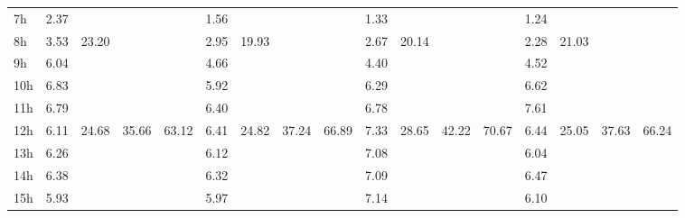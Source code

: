 \begin{center}
\begin{tabular}{l || c | c | c | c | c | c | c | c | c | c | c | c | c | c | c | c |}
7h & \multirow{1}{*}{ 2.37 }  & & & & \multirow{1}{*}{ 1.56 }  & & & & \multirow{1}{*}{ 1.33 }  & & & & \multirow{1}{*}{ 1.24 }  & & & \\\cline{1-1}\cline{5-5}\cline{9-9}\cline{13-13}\cline{2-2}\cline{6-6}\cline{10-10}\cline{14-14}
8h & \multirow{1}{*}{ 3.53 }  & \multirow{4}{*}{ 23.20 }  & & & \multirow{1}{*}{ 2.95 }  & \multirow{4}{*}{ 19.93 }  & & & \multirow{1}{*}{ 2.67 }  & \multirow{4}{*}{ 20.14 }  & & & \multirow{1}{*}{ 2.28 }  & \multirow{4}{*}{ 21.03 }  & & \\\cline{1-1}\cline{5-5}\cline{9-9}\cline{13-13}
9h & \multirow{1}{*}{ 6.04 }  & & & & \multirow{1}{*}{ 4.66 }  & & & & \multirow{1}{*}{ 4.40 }  & & & & \multirow{1}{*}{ 4.52 }  & & & \\\cline{1-1}\cline{5-5}\cline{9-9}\cline{13-13}
10h & \multirow{1}{*}{ 6.83 }  & & & & \multirow{1}{*}{ 5.92 }  & & & & \multirow{1}{*}{ 6.29 }  & & & & \multirow{1}{*}{ 6.62 }  & & & \\\cline{1-1}\cline{5-5}\cline{9-9}\cline{13-13}
11h & \multirow{1}{*}{ 6.79 }  & & & & \multirow{1}{*}{ 6.40 }  & & & & \multirow{1}{*}{ 6.78 }  & & & & \multirow{1}{*}{ 7.61 }  & & & \\\cline{1-1}\cline{5-5}\cline{9-9}\cline{13-13}\cline{2-2}\cline{6-6}\cline{10-10}\cline{14-14}\cline{3-3}\cline{7-7}\cline{11-11}\cline{15-15}\cline{4-4}\cline{8-8}\cline{12-12}\cline{16-16}
12h & \multirow{1}{*}{ 6.11 }  & \multirow{4}{*}{ 24.68 }  & \multirow{6}{*}{ 35.66 }  & \multirow{12}{*}{ 63.12 }  & \multirow{1}{*}{ 6.41 }  & \multirow{4}{*}{ 24.82 }  & \multirow{6}{*}{ 37.24 }  & \multirow{12}{*}{ 66.89 }  & \multirow{1}{*}{ 7.33 }  & \multirow{4}{*}{ 28.65 }  & \multirow{6}{*}{ 42.22 }  & \multirow{12}{*}{ 70.67 }  & \multirow{1}{*}{ 6.44 }  & \multirow{4}{*}{ 25.05 }  & \multirow{6}{*}{ 37.63 }  & \multirow{12}{*}{ 66.24 }  \\\cline{1-1}\cline{5-5}\cline{9-9}\cline{13-13}
13h & \multirow{1}{*}{ 6.26 }  & & & & \multirow{1}{*}{ 6.12 }  & & & & \multirow{1}{*}{ 7.08 }  & & & & \multirow{1}{*}{ 6.04 }  & & & \\\cline{1-1}\cline{5-5}\cline{9-9}\cline{13-13}
14h & \multirow{1}{*}{ 6.38 }  & & & & \multirow{1}{*}{ 6.32 }  & & & & \multirow{1}{*}{ 7.09 }  & & & & \multirow{1}{*}{ 6.47 }  & & & \\\cline{1-1}\cline{5-5}\cline{9-9}\cline{13-13}
15h & \multirow{1}{*}{ 5.93 }  & & & & \multirow{1}{*}{ 5.97 }  & & & & \multirow{1}{*}{ 7.14 }  & & & & \multirow{1}{*}{ 6.10 }  & & & \\\cline{1-1}\cline{5-5}\cline{9-9}\cline{13-13}\cline{2-2}\cline{6-6}\cline{10-10}\cline{14-14}

\end{tabular}
\end{center}
